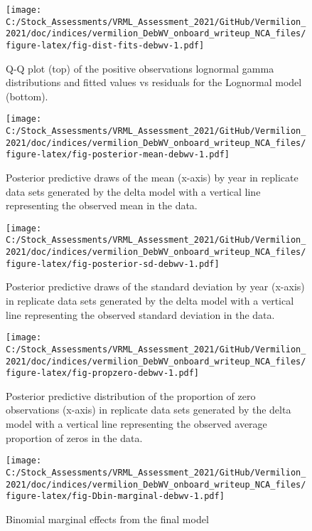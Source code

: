 \documentclass[
]{article}
\begin{document}
\begin{figure}
\centering
\texttt{[image: C:/Stock\_Assessments/VRML\_Assessment\_2021/GitHub/Vermilion\_2021/doc/indices/vermilion\_DebWV\_onboard\_writeup\_NCA\_files/figure-latex/fig-dist-fits-debwv-1.pdf]}
\caption{\label{fig:fig-dist-fits-debwv}Q-Q plot (top) of the positive observations lognormal gamma distributions and fitted values vs residuals for the Lognormal model (bottom).}
\end{figure}

\begin{figure}
\centering
\texttt{[image: C:/Stock\_Assessments/VRML\_Assessment\_2021/GitHub/Vermilion\_2021/doc/indices/vermilion\_DebWV\_onboard\_writeup\_NCA\_files/figure-latex/fig-posterior-mean-debwv-1.pdf]}
\caption{\label{fig:fig-posterior-mean-debwv}Posterior predictive draws of the mean (x-axis) by year in replicate data sets generated by the delta model with a vertical line representing the observed mean in the data.}
\end{figure}

\FloatBarrier

\begin{figure}
\centering
\texttt{[image: C:/Stock\_Assessments/VRML\_Assessment\_2021/GitHub/Vermilion\_2021/doc/indices/vermilion\_DebWV\_onboard\_writeup\_NCA\_files/figure-latex/fig-posterior-sd-debwv-1.pdf]}
\caption{\label{fig:fig-posterior-sd-debwv}Posterior predictive draws of the standard deviation by year (x-axis) in replicate data sets generated by the delta model with a vertical line representing the observed standard deviation in the data.}
\end{figure}

\begin{figure}
\centering
\texttt{[image: C:/Stock\_Assessments/VRML\_Assessment\_2021/GitHub/Vermilion\_2021/doc/indices/vermilion\_DebWV\_onboard\_writeup\_NCA\_files/figure-latex/fig-propzero-debwv-1.pdf]}
\caption{\label{fig:fig-propzero-debwv}Posterior predictive distribution of the proportion of zero observations (x-axis) in replicate data sets generated by the delta model with a vertical line representing the observed average proportion of zeros in the data.}
\end{figure}

\begin{figure}
\centering
\texttt{[image: C:/Stock\_Assessments/VRML\_Assessment\_2021/GitHub/Vermilion\_2021/doc/indices/vermilion\_DebWV\_onboard\_writeup\_NCA\_files/figure-latex/fig-Dbin-marginal-debwv-1.pdf]}
\caption{\label{fig:fig-Dbin-marginal-debwv}Binomial marginal effects from the final model}
\end{figure}
\end{document}

